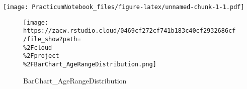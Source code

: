 \documentclass[
]{article}
\begin{document}
\texttt{[image: PracticumNotebook\_files/figure-latex/unnamed-chunk-1-1.pdf]}

\begin{figure}
\centering
\texttt{[image: https://zacw.rstudio.cloud/0469cf272cf741b183c40cf2932686cf/file\_show?path=\\\%2Fcloud\\\%2Fproject\\\%2FBarChart\_AgeRangeDistribution.png]}
\caption{BarChart\_AgeRangeDistribution}
\end{figure}
\end{document}
